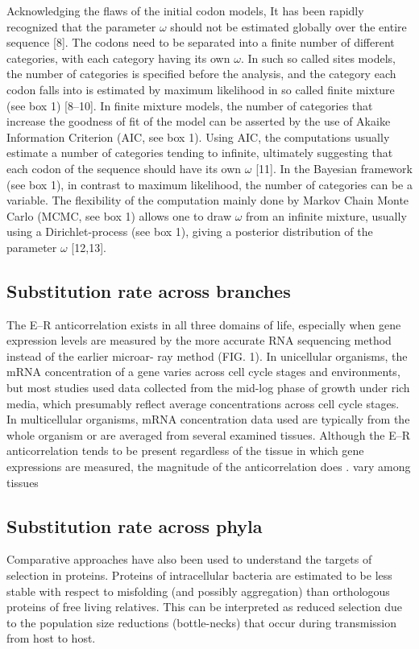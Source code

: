 Acknowledging the flaws of the initial \gls{codon} models, It has been rapidly recognized that the parameter $\omega$ should not be estimated globally over the entire sequence [8]. The codons need to be separated into a finite number of different categories, with each category having its own $\omega$. In such so called sites models, the number of categories is specified before the analysis, and the category each \gls{codon} falls into is estimated by maximum \gls{likelihood} in so called finite \gls{mixture} (see box 1) [8–10]. In finite mixture models, the number of categories that increase the goodness of fit of the model can be asserted by the use of Akaike Information Criterion (AIC, see box 1). Using AIC, the computations usually estimate a number of categories tending to infinite, ultimately suggesting that each \gls{codon} of the sequence should have its own $\omega$ [11]. In the Bayesian framework (see box 1), in contrast to maximum \gls{likelihood}, the number of categories can be a variable. The flexibility of the computation mainly done by Markov Chain Monte Carlo (MCMC, see box 1) allows one to draw $\omega$ from an infinite mixture, usually using a \gls{Dirichlet-process} (see box 1), giving a \gls{posterior} distribution of the parameter $\omega$ [12,13]. 

\subsection{Substitution rate across branches}


The E–R anticorrelation exists in all three domains of life, especially when gene
expression levels are measured by the more accurate \acrshort{RNA} sequencing method instead of the earlier microar- ray method (FIG. 1). In unicellular organisms, the mRNA concentration of a gene varies across cell cycle stages and environments, but most studies used data collected from the mid-log phase of growth under rich media, which presumably reflect average concentrations across
cell cycle stages. In multicellular organisms, mRNA concentration data used are typically from the whole organism or are averaged from several examined tissues. Although the E–R anticorrelation tends to be present regardless of the tissue in which gene expressions are measured, the magnitude of the anticorrelation does
.
vary among tissues




\subsection{Substitution rate across phyla}
Comparative approaches have also been used to understand the targets of selection in proteins. Proteins of intracellular bacteria are estimated to be less stable with respect to misfolding (and possibly aggregation) than orthologous proteins of free living relatives. This can be interpreted as reduced selection due to the population size reductions (bottle-necks) that occur during transmission from host to host.

